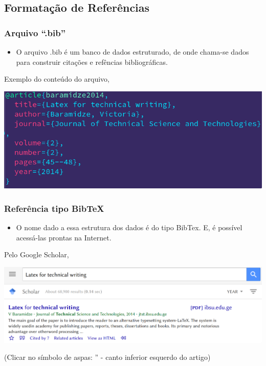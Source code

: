\documentclass{beamer}
\begin{document}
\begin{frame}
  \section{Formatação de Referências}
  \frametitle{Arquivo ``.bib''}

  \begin{itemize}
  \item O arquivo .bib é um banco de dados estruturado, de onde chama-se
    dados para construir citações e refências bibliográficas.
  \end{itemize}


  Exemplo do conteúdo do arquivo,
  \begin{center}
    \includegraphics[scale=0.40]{../Imagens/A2I101.png}
  \end{center}
\end{frame}

\begin{frame}
  \frametitle{Referência tipo BibTeX}

  \begin{itemize}
  \item O nome dado a essa estrutura dos dados é do tipo BibTex. E, é
    possível acessá-las prontas na Internet.
  \end{itemize}


  Pelo Google Scholar,
  \begin{center}
    \includegraphics[scale=0.20]{../Imagens/A2I102.png}
  \end{center}
  (Clicar no símbolo de aspas: '' - canto inferior esquerdo do artigo)


\end{frame}
\end{document}
